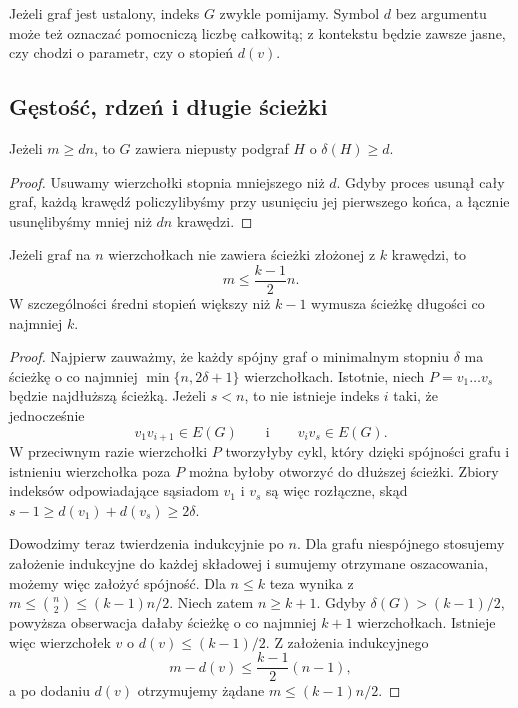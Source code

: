 \documentclass{lecture-kuznia}
\newenvironment{theoryproof}{\begin{proof}}{\end{proof}}
\begin{document}
Jeżeli graf jest ustalony, indeks $G$ zwykle pomijamy. Symbol $d$ bez
argumentu może też oznaczać pomocniczą liczbę całkowitą; z kontekstu będzie
zawsze jasne, czy chodzi o parametr, czy o stopień $d(v)$.

\subsection{Gęstość, rdzeń i długie ścieżki}

\begin{lemma}
	Jeżeli $m\geqslant dn$, to $G$ zawiera niepusty podgraf $H$ o
	$\delta(H)\geqslant d$.
\end{lemma}

\begin{theoryproof}
	Usuwamy wierzchołki stopnia mniejszego niż $d$. Gdyby proces usunął cały
	graf, każdą krawędź policzylibyśmy przy usunięciu jej pierwszego końca, a
	łącznie usunęlibyśmy mniej niż $dn$ krawędzi.
\end{theoryproof}

\begin{theorem}
	Jeżeli graf na $n$ wierzchołkach nie zawiera ścieżki złożonej z $k$
	krawędzi, to
	\[
		m\leqslant\frac{k-1}{2}n.
	\]
	W szczególności średni stopień większy niż $k-1$ wymusza ścieżkę długości
	co najmniej $k$.
\end{theorem}

\begin{theoryproof}
	Najpierw zauważmy, że każdy spójny graf o minimalnym stopniu $\delta$ ma
	ścieżkę o co najmniej $\min\{n,2\delta+1\}$ wierzchołkach. Istotnie, niech
	$P=v_1\ldots v_s$ będzie najdłuższą ścieżką. Jeżeli $s<n$, to nie istnieje
	indeks $i$ taki, że jednocześnie
	\[
		v_1v_{i+1}\in E(G)
		\qquad\text{i}\qquad
		v_iv_s\in E(G).
	\]
	W przeciwnym razie wierzchołki $P$ tworzyłyby cykl, który dzięki spójności
	grafu i istnieniu wierzchołka poza $P$ można byłoby otworzyć do dłuższej
	ścieżki. Zbiory indeksów odpowiadające sąsiadom $v_1$ i $v_s$ są więc
	rozłączne, skąd $s-1\geqslant d(v_1)+d(v_s)\geqslant2\delta$.

	Dowodzimy teraz twierdzenia indukcyjnie po $n$. Dla grafu niespójnego
	stosujemy założenie indukcyjne do każdej składowej i sumujemy otrzymane
	oszacowania, możemy więc założyć spójność. Dla $n\leqslant k$ teza wynika z
	$m\leqslant\binom n2\leqslant(k-1)n/2$. Niech zatem $n\geqslant k+1$.
	Gdyby $\delta(G)>(k-1)/2$, powyższa obserwacja dałaby ścieżkę o co najmniej
	$k+1$ wierzchołkach. Istnieje więc wierzchołek $v$ o
	$d(v)\leqslant(k-1)/2$. Z założenia indukcyjnego
	\[
		m-d(v)\leqslant\frac{k-1}{2}(n-1),
	\]
	a po dodaniu $d(v)$ otrzymujemy żądane $m\leqslant(k-1)n/2$.
\end{theoryproof}
\end{document}
